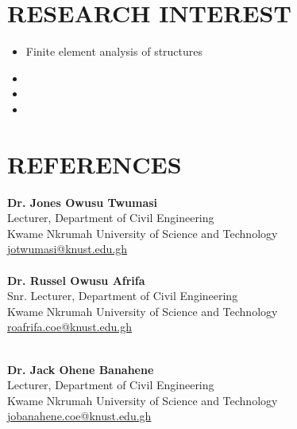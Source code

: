 \documentclass[letterpaper, 12pt]{article}
\newcommand{\cvsection}[1]{
	
	\section*{#1}
}
\newcommand{\itemizeMargin}{11pt}
\begin{document}
	
	\cvsection{RESEARCH INTEREST}
	
	\begin{itemize}[leftmargin=\itemizeMargin]
		
		\item Finite element analysis of structures
		\item 
		\item 
		\item
		
	\end{itemize}
	
	
	\cvsection{REFERENCES}
	
	
	\begin{multicols}{2}
		\textbf{Dr. Jones Owusu Twumasi} \\ [4pt]
		Lecturer, Department of Civil Engineering \\ [4pt]
		Kwame Nkrumah University of Science and Technology \\ [4pt]
		\faEnvelopeSquare \space \href{mailto:jotwumasi@knust.edu.gh}{jotwumasi@knust.edu.gh} \\ [4pt]
		\faPhone {} \\ [4pt]
		
		\textbf{Dr. Russel Owusu Afrifa} \\ [4pt]
		Snr. Lecturer, Department of Civil Engineering \\ [4pt]
		Kwame Nkrumah University of Science and Technology \\ [4pt]
		\faEnvelopeSquare \space \href{mailto:roafrifa.coe@knust.edu.gh}{roafrifa.coe@knust.edu.gh} \\ [4pt]
		\faPhone {} \\
		
		\columnbreak
		
		\textbf{Dr. Jack Ohene Banahene} \\ [4pt]
		Lecturer, Department of Civil Engineering \\ [4pt]
		Kwame Nkrumah University of Science and Technology \\ [4pt]
		\faEnvelopeSquare \space \href{mailto:jobanahene.coe@knust.edu.gh}{jobanahene.coe@knust.edu.gh}\\[4pt]
		\faPhone {} \\ [4pt]

	\end{multicols}
	
\end{document}
